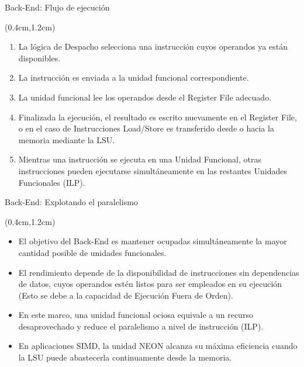 \begin{frame}{Back-End: Flujo de ejecución}
 \begin{textblock*}{\textwidth}(0.4cm,1.2cm)
  \begin{tcolorbox}[enhanced jigsaw,rounded corners,drop fuzzy shadow=ShadowColor]
   \begin{enumerate}[<+->]\justifying
    \item La lógica de Despacho selecciona una instrucción cuyos operandos ya están disponibles.
    \item La instrucción es enviada a la unidad funcional correspondiente.
    \item La unidad funcional lee los operandos desde el Register File adecuado.
    \item Finalizada la ejecución, el resultado es escrito nuevamente en el Register File, o en el caso de Instrucciones Load/Store es transferido desde o hacia la memoria mediante la LSU.
    \item Mientras una instrucción se ejecuta en una Unidad Funcional, otras instrucciones pueden ejecutarse simultáneamente en las restantes Unidades Funcionales (ILP).
   \end{enumerate}
  \end{tcolorbox}
 \end{textblock*}
\end{frame}

\begin{frame}{Back-End: Explotando el paralelismo}
 \begin{textblock*}{\textwidth}(0.4cm,1.2cm)
  \begin{tcolorbox}[enhanced jigsaw,rounded corners,drop fuzzy shadow=ShadowColor]
   \begin{itemize}[<+->]\justifying
    \item El objetivo del Back-End es mantener ocupadas simultáneamente la mayor cantidad posible de unidades funcionales.
    \item El rendimiento depende de la disponibilidad de instrucciones sin dependencias de datos, cuyos operandos estén listos para ser empleados en su ejecución (Esto se debe a la capacidad de Ejecución Fuera de Orden).
    \item En este marco, una unidad funcional ociosa equivale a un recurso desaprovechado y reduce el paralelismo a nivel de instrucción (ILP).
    \item En aplicaciones SIMD, la unidad NEON alcanza su máxima eficiencia cuando la LSU puede abastecerla continuamente desde la memoria.
   \end{itemize}
  \end{tcolorbox}
 \end{textblock*}
\end{frame}

